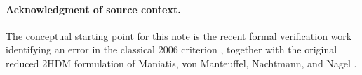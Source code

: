 \documentclass[11pt,a4paper]{article}
\theoremstyle{plain}
\theoremstyle{definition}
\theoremstyle{remark}
\begin{document}
\paragraph{Acknowledgment of source context.}
The conceptual starting point for this note is the recent formal verification work identifying an error in the classical 2006 criterion \cite{ToobySmith2026}, together with the original reduced 2HDM formulation of Maniatis, von Manteuffel, Nachtmann, and Nagel \cite{Maniatis2006}.



\end{document}
